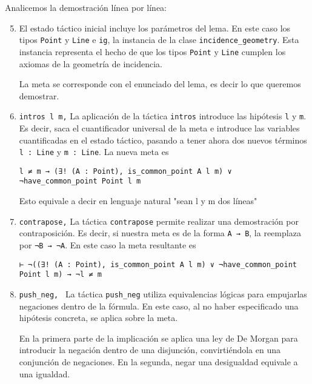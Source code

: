 Analicemos la demostración línea por línea:
\begin{enumerate}[label=L.\arabic*, topsep=0mm]
	\setcounter{enumi}{4}

	\item El estado táctico inicial incluye los parámetros del lema. En este caso
	      los tipos \lstinline{Point} y \lstinline{Line} e \lstinline{ig}, la
	      instancia de la clase \lstinline{incidence_geometry}. Esta instancia
	      representa el hecho de que los tipos \lstinline{Point} y \lstinline{Line}
	      cumplen los axiomas de la geometría de incidencia.

	      La meta se corresponde con el enunciado del lema, es decir lo que queremos
	      demostrar.


	\item \lstinline{intros l m,} La aplicación de la táctica \lstinline{intros}
	      introduce las hipótesis \lstinline{l} y \lstinline{m}. Es decir, saca el
	      cuantificador universal de la meta e introduce las variables cuantificadas
	      en el estado táctico, pasando a tener ahora dos nuevos términos
	      \lstinline{l : Line} y \lstinline{m : Line}. La nueva meta es
	      \begin{lstlisting}
l ≠ m → (∃! (A : Point), is_common_point A l m) ∨ ¬have_common_point Point l m
\end{lstlisting}
	      Esto equivale a decir en lenguaje natural "sean l y m dos líneas"

	\item \lstinline{contrapose,} La táctica \lstinline{contrapose} permite
	      realizar una demostración por contraposición. Es decir, si nuestra meta es
	      de la forma \lstinline{A → B}, la reemplaza por \lstinline{¬B → ¬A}. En
	      este caso la meta resultante es
	      \begin{lstlisting}
⊢ ¬((∃! (A : Point), is_common_point A l m) ∨ ¬have_common_point Point l m) → ¬l ≠ m
\end{lstlisting}

	\item \lstinline{push_neg, } La táctica \lstinline{push_neg} utiliza
	      equivalencias lógicas para \guillemotleft empujar\guillemotright las negaciones dentro de la fórmula.
	      En este caso, al no haber especificado una hipótesis concreta, se aplica
	      sobre la meta.

	      En la primera parte de la implicación se aplica una ley de De Morgan para
	      introducir la negación dentro de una disjunción, convirtiéndola en una
	      conjunción de negaciones. En la segunda, negar una desigualdad equivale a
	      una igualdad.


\end{enumerate}
